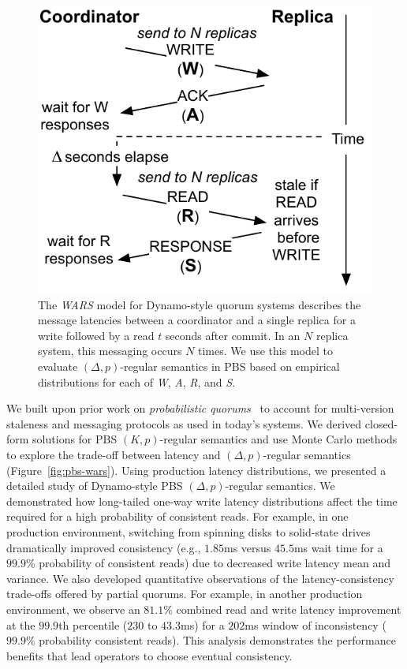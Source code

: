 \begin{figure}
\centering
\includegraphics[width=.5\columnwidth]{figs/dynamostale.pdf}\vspace{.5em}
\caption{The \textit{WARS} model for Dynamo-style quorum systems
  describes the message latencies between a coordinator and a single
  replica for a write followed by a read $t$ seconds after commit.  In
  an $N$ replica system, this messaging occurs $N$ times. We use this
  model to evaluate $(\Delta, p)$-regular semantics in PBS based on
  empirical distributions for each of \textit{W}, \textit{A},
  \textit{R}, and \textit{S}.}
\label{fig:dynamo-diagram}
\end{figure}


We built upon prior work on \textit{probabilistic
  quorums}~\cite{prob-quorum,quorum-overview} to account for
multi-version staleness and messaging protocols as used in today's
systems. We derived closed-form solutions for PBS $(K, p)$-regular
semantics and use Monte Carlo methods to explore the trade-off between
latency and $(\Delta, p)$-regular semantics (Figure~\ref{fig:pbs-wars}). Using production latency
distributions, we presented a detailed study of Dynamo-style PBS
$(\Delta, p)$-regular semantics. We demonstrated how long-tailed
one-way write latency distributions affect the time required for a
high probability of consistent reads.  For example, in one production
environment, switching from spinning disks to solid-state drives
dramatically improved consistency (e.g., $1.85$ms versus $45.5$ms wait
time for a $99.9$\% probability of consistent reads) due to decreased
write latency mean and variance.  We also developed quantitative
observations of the latency-consistency trade-offs offered by partial
quorums.  For example, in another production environment, we observe
an $81.1\%$ combined read and write latency improvement at the
$99.9$th percentile ($230$ to $43.3$ms) for a $202$ms window of
inconsistency ($99.9\%$ probability consistent reads). This analysis
demonstrates the performance benefits that lead operators to choose
eventual consistency.

